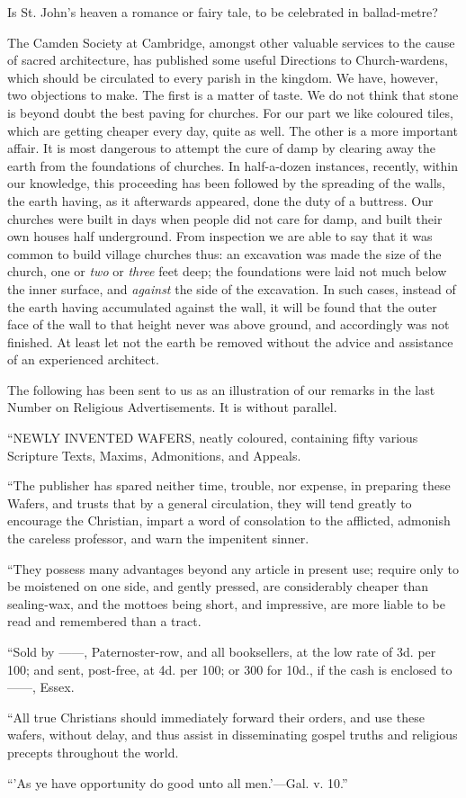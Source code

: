 Is St. John's heaven a romance or fairy tale, to be
celebrated in ballad-metre?

The Camden Society at Cambridge, amongst other
valuable services to the cause of sacred architecture, has published
some useful Directions to Church-wardens, which should be circulated to
every parish in the kingdom. We have, however, two objections to make.
The first is a matter of taste. We do not think that stone is beyond
doubt the best paving for churches. For our part we like coloured
tiles, which are getting cheaper every day, quite as well. The other is
a more important affair. It is most dangerous to attempt the cure of
damp by clearing away the earth from the foundations of churches. In
half-a-dozen instances, recently, within our knowledge, this proceeding
has been followed by the spreading of the walls, the earth having, as it
afterwards appeared, done the duty of a buttress. Our churches were
built in days when people did not care for damp, and built their own
houses half underground. From inspection we are able to say that it was
common to build village churches thus: an excavation was made the size
of the church, one or \emph{two} or \emph{three} feet deep; the
foundations were laid not much below the inner surface, and \emph{against}
the side of the excavation. In such cases, instead of the earth having
accumulated against the wall, it will be found that the outer face of
the wall to that height never was above ground, and accordingly was not
finished. At least let not the earth be removed without the advice and
assistance of an experienced architect.

The following has been sent to us as an
illustration of our remarks in the last Number on Religious
Advertisements. It is without parallel.

``NEWLY
INVENTED WAFERS,
neatly coloured, containing fifty various Scripture Texts, Maxims,
Admonitions, and Appeals.

``The publisher has spared neither
time, trouble, nor expense, in preparing these Wafers, and trusts that
by a general circulation, they will tend greatly to encourage the
Christian, impart a word of consolation to the afflicted, admonish the
careless professor, and warn the impenitent sinner.

``They possess many advantages beyond
any article in present use; require only to be moistened on one side,
and gently pressed, are considerably cheaper than sealing-wax, and the
mottoes being short, and impressive, are more liable to be read and
remembered than a tract.

``Sold by ——, Paternoster-row,
and all booksellers, at the low rate of 3d. per 100; and sent,
post-free, at 4d. per 100; or 300 for 10d., if the cash is enclosed to
——, Essex.

``All true Christians should
immediately forward their orders, and use these wafers, without delay,
and thus assist in disseminating gospel truths and religious precepts
throughout the world.

``'As ye have
opportunity do good unto all men.'—Gal. v. 10.''
